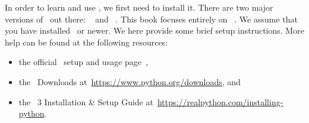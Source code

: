 %
\label{sec:installingPython}%
In order to learn and use \python, we first need to install it.
There are two major versions of \python\ out there: \python~ and \python~.
This book focuses entirely on \python~.
We assume that you have installed \pythonWithVersion\ or newer.
We here provide some brief setup instructions.
More help can be found at the following resources:%
%
\begin{itemize}%
\item the official \python\ setup and usage page~,%
\item the \python\ Downloads at~\url{https://www.python.org/downloads}, and%
\item the \python~3 Installation \& Setup Guide at~\url{https://realpython.com/installing-python}.%
\end{itemize}%
%
%
%
%
\FloatBarrier%
\endhsection%
%
